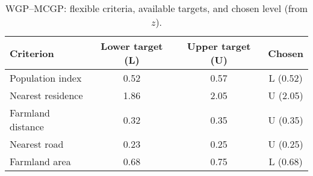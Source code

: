 \begin{table}[htbp]
\centering
\caption{WGP–MCGP: flexible criteria, available targets, and chosen level (from $z$).}
\label{tab:wgpMC_choices}
\begin{tabular}{lccc}
\hline
\textbf{Criterion} & \textbf{Lower target (L)} & \textbf{Upper target (U)} & \textbf{Chosen} \\
\hline
Population index      & 0.52 & 0.57 & L (0.52) \\
Nearest residence     & 1.86 & 2.05 & U (2.05) \\
Farmland distance     & 0.32 & 0.35 & U (0.35) \\
Nearest road          & 0.23 & 0.25 & U (0.25) \\
Farmland area         & 0.68 & 0.75 & L (0.68) \\
\hline
\end{tabular}
\end{table}
